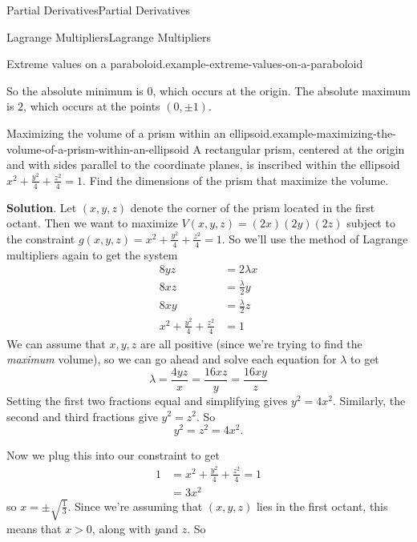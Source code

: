 \documentclass[10pt,]{book}
\numberwithin{equation}{section}
\begin{document}
\begin{chapterptx}{Partial Derivatives}{}{Partial Derivatives}{}{}
\begin{sectionptx}{Lagrange Multipliers}{}{Lagrange Multipliers}{}{}
\begin{example}{Extreme values on a paraboloid.}{example-extreme-values-on-a-paraboloid}
\begin{table}
\end{table}
 So the absolute minimum is \(0\), which occurs at the origin. The absolute maximum is \(2\), which occurs at the points \((0,\pm1)\).%
\end{example}
\begin{example}{Maximizing the volume of a prism within an ellipsoid.}{example-maximizing-the-volume-of-a-prism-within-an-ellipsoid}%
\hypertarget{p-1235}{}%
A rectangular prism, centered at the origin and with sides parallel to the coordinate planes, is inscribed within the ellipsoid \(x^{2} + \frac{y^{2}}{4} + \frac{z^{2}}{4} = 1\). Find the dimensions of the prism that maximize the volume.%
\par\smallskip%
\noindent\textbf{Solution}.\hypertarget{solution-195}{}\quad%
\hypertarget{p-1236}{}%
Let \((x,y,z)\) denote the corner of the prism located in the first octant. Then we want to maximize \(V(x,y,z) = (2x)(2y)(2z)\) subject to the constraint \(g(x,y,z) = x^{2} + \frac{y^{2}}{4} + \frac{z^{2}}{4} = 1\). So we'll use the method of Lagrange multipliers again to get the system%
\begin{align*}
8yz & = 2\lambda x \\
8xz & = \frac{\lambda}{2}y \\
8xy & = \frac{\lambda}{2}z \\
x^{2} + \frac{y^{2}}{4} + \frac{z^{2}}{4} & =1 
\end{align*}
We can assume that \(x,y,z\) are all positive (since we're trying to find the \emph{maximum} volume), so we can go ahead and solve each equation for \(\lambda\) to get%
\begin{equation*}
\lambda = \frac{4yz}{x} = \frac{16xz}{y} = \frac{16xy}{z}
\end{equation*}
Setting the first two fractions equal and simplifying gives \(y^{2} = 4x^{2}\). Similarly, the second and third fractions give \(y^{2} = z^{2}\). So%
\begin{equation*}
y^{2} = z^{2} = 4x^{2}.
\end{equation*}
%
\par
\hypertarget{p-1237}{}%
Now we plug this into our constraint to get%
\begin{align*}
1 & = x^{2} + \frac{y^{2}}{4} + \frac{z^{2}}{4} = 1 \\
& = 3x^{2} 
\end{align*}
so \(x = \pm\sqrt{\frac{1}{3}}\). Since we're assuming that \((x,y,z)\) lies in the first octant, this means that \(x > 0\), along with \(y \)and \(z\). So%
\begin{align*}

\end{align*}
\end{example}
\end{sectionptx}
\end{chapterptx}
\end{document}
